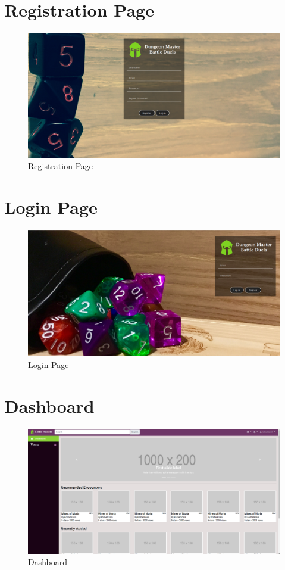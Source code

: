 \documentclass[12pt,a4paper]{report}
\begin{document}
	\section{Registration Page}
	\begin{figure}[H]
		\centering
		\includegraphics[scale=.20]{register}
		\caption{Registration Page}
		\label{fig: Registration Page}
	\end{figure}

	\section{Login Page}
	\begin{figure}[H]
		\centering
		\includegraphics[scale=.20]{login}
		\caption{Login Page}
		\label{fig: Login Page}
	\end{figure}

	\section{Dashboard}
	\begin{figure}[H]
		\centering
		\includegraphics[scale=.20]{home}
		\caption{Dashboard}
		\label{fig: Dashboard}
	\end{figure}
\end{document}
